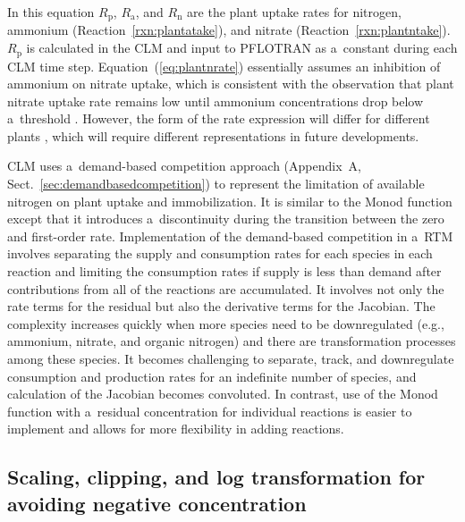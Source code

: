 \documentclass[gmd,noline]{copernicus}
\begin{document}
      In this equation $R_\mathrm{p}$, $R_\mathrm{a}$, and $R_\mathrm{n}$
      are the plant uptake rates for nitrogen, ammonium
      (Reaction~\ref{rxn:plantatake}), and nitrate
      (Reaction~\ref{rxn:plantntake}). $R_\mathrm{p}$ is calculated in the CLM and input
      to PFLOTRAN as a~constant during each CLM time
      step. Equation~(\ref{eq:plantnrate}) essentially assumes an inhibition
      of ammonium on nitrate uptake, which is consistent with the
      observation that plant nitrate uptake rate remains low until ammonium
      concentrations drop below a~threshold \citep{eltrop1996}.  However,
      the form of the rate expression will differ for different plants
      \citep{Pfautsch2009,Warren2007,Nordin2001,Falkengren1995,Gherardi2013},
      which will require different representations in future developments.

      CLM uses a~demand-based competition approach (Appendix~A,
      Sect.~\ref{sec:demandbasedcompetition}) to represent the limitation of
      available nitrogen on plant uptake and immobilization. It is similar
      to the Monod function except that it introduces a~discontinuity during
      the transition between the zero and first-order rate. Implementation
      of the demand-based competition in a~RTM involves separating the
      supply and consumption rates for each species in each reaction and
      limiting the consumption rates if supply is less than demand after
      contributions from all of the reactions are accumulated. It involves
      not only the rate terms for the residual but also the derivative terms
      for the Jacobian. The complexity increases quickly when more species
      need to be downregulated (e.g., ammonium, nitrate, and organic
      nitrogen) and there are transformation processes among these
      species. It becomes challenging to separate, track, and downregulate
      consumption and production rates for an indefinite number of species,
      and calculation of the Jacobian becomes convoluted. In contrast, use
      of the Monod function with a~residual concentration for individual
      reactions is easier to implement and allows for more flexibility in adding
      reactions.



\subsection{Scaling, clipping, and log transformation for avoiding negative concentration}%
\end{document}
